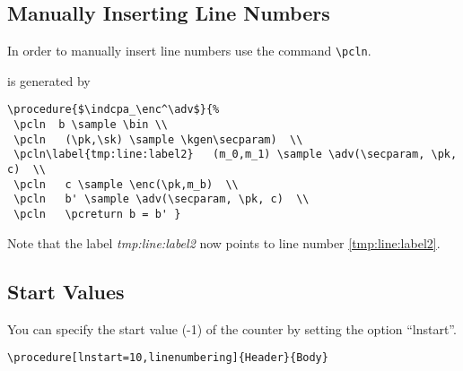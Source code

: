 \documentclass[a4paper]{report}
\begin{document}
\subsection{Manually Inserting Line Numbers}
In order to manually insert line numbers use the command \lstinline$\pcln$.
\begin{center}
\end{center}
is generated by
\begin{lstlisting}
\procedure{$\indcpa_\enc^\adv$}{%
 \pcln  b \sample \bin \\
 \pcln   (\pk,\sk) \sample \kgen\secparam)  \\
 \pcln\label{tmp:line:label2}   (m_0,m_1) \sample \adv(\secparam, \pk, c)  \\
 \pcln   c \sample \enc(\pk,m_b)  \\
 \pcln   b' \sample \adv(\secparam, \pk, c)  \\
 \pcln   \pcreturn b = b' }
\end{lstlisting}
Note that the label \emph{tmp:line:label2} now points to line number \ref{tmp:line:label2}.



\subsection{Start Values}
You can specify the start value (-1) of the counter by setting the option \enquote{lnstart}.
\begin{lstlisting}
\procedure[lnstart=10,linenumbering]{Header}{Body}
\end{lstlisting}
\begin{center}
\end{center}
\end{document}
